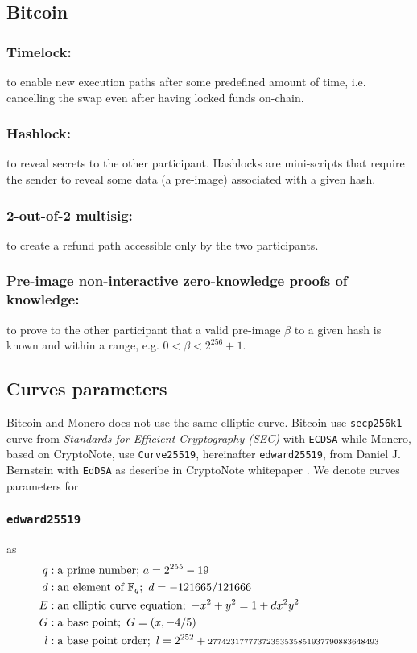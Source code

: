 \documentclass{llncs}
\begin{document}
\subsection{Bitcoin}
\subsubsection{Timelock:}
to enable new execution paths after some predefined amount of time, i.e. cancelling the swap even after having locked funds on-chain.

\subsubsection{Hashlock:}
to reveal secrets to the other participant. Hashlocks are mini-scripts that require the sender to reveal some data (a pre-image) associated with a given hash.

\subsubsection{2-out-of-2 multisig:}
to create a refund path accessible only by the two participants.

\subsubsection{Pre-image non-interactive zero-knowledge proofs of knowledge:}
to prove to the other participant that a valid pre-image $\beta$ to a given hash is known and within a range, e.g. $0 < \beta < 2^{256} + 1$.

\subsection{Curves parameters}
Bitcoin and Monero does not use the same elliptic curve. Bitcoin use \texttt{secp256k1} curve from \textit{Standards for Efficient Cryptography (SEC)} with \texttt{ECDSA} while Monero, based on CryptoNote, use \texttt{Curve25519}, hereinafter \texttt{edward25519}, from Daniel J. Bernstein with \texttt{EdDSA} as describe in CryptoNote whitepaper \cite{CerRes10, van2013cryptonote}. We denote curves parameters for

\subsubsection{\texttt{edward25519}} as
\begin{equation}
\begin{split}
    q&: \text{a prime number;}\ a = 2^{255} - 19 \\
    d&: \text{an element of } \mathbb{F}_q;\ d = - 121665/121666 \\
    E&: \text{an elliptic curve equation};\ -x^2 + y^2 = 1 + dx^2y^2 \\
    G&: \text{a base point};\ G = (x, -4/5) \\
    l&: \text{a base point order};\ l = 2^{252} + \scriptsize\text{27742317777372353535851937790883648493} \\
\end{split}
\end{equation}
\end{document}
